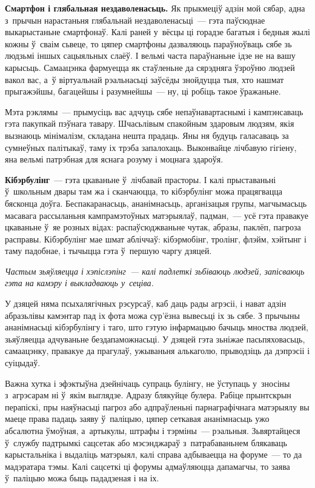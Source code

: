 
\textbf{Смартфон і глябальная нездаволенасьць.} Як прыкмеціў адзін мой сябар, адна з~прычын нарастаньня глябальнай нездаволенасьці~--- гэта паўсюднае выкарыстаньне смартфонаў. Калі раней у~вёсцы ці горадзе багатыя і бедныя жылі кожны ў~сваім сьвеце, то цяпер смартфоны дазваляюць параўноўваць сябе зь людзьмі іншых сацыяльных слаёў. І вельмі часта параўнаньне ідзе не на вашу карысьць. Самаацэнка фармуецца як стаўленьне да сярэдняга ўзроўню людзей вакол вас, а~ў віртуальнай рэальнасьці заўсёды знойдуцца тыя, хто нашмат прыгажэйшы, багацейшы і разумнейшы~--- ну, ці робіць такое ўражаньне.

Мэта рэклямы~--- прымусіць вас адчуць сябе непаўнавартаснымі і кампэнсаваць гэта пакупкай пэўнага тавару. Шчасьлівым спакойным здаровым людзям, якія вызнаюць мінімалізм, складана нешта прадаць. Яны ня будуць галасаваць за сумнеўных палітыкаў, таму іх трэба запалохаць. Выконвайце лічбавую гігіену, яна вельмі патрэбная для яснага розуму і моцнага здароўя.

\textbf{Кібэрбулінг}~--- гэта цкаваньне ў~лічбавай прасторы. І калі прыставаньні ў~школьным двары там жа і сканчаюцца, то кібэрбулінг можа працягвацца бясконца доўга. Беспакаранасьць, ананімнасьць, арганізацыя групы, магчымасьць масавага рассыланьня кампрамэтоўных матэрыялаў, падман,~--- усё гэта правакуе цкаваньне ў~яе розных відах: распаўсюджваньне чутак, абразы, паклёп, пагроза расправы. Кібэрбулінг мае шмат абліччаў: кібэрмобінг, тролінг, флэйм, хэйтынг і таму падобнае, і тычыцца гэта ў~першую чаргу дзяцей.

\emph{Частым зьяўляецца і хэпіслэпінг~--- калі падлеткі зьбіваюць людзей, запісваюць гэта на камэру і выкладваюць у~сеціва.}

У дзяцей няма псыхалягічных рэсурсаў, каб даць рады агрэсіі, і нават адзін абразьлівы камэнтар пад іх фота можа сур'ёзна вывесьці іх зь сябе. З прычыны ананімнасьці кібэрбулінгу і таго, што гэтую інфармацыю бачыць мноства людзей, зьяўляецца адчуваньне бездапаможнасьці. У дзяцей гэта зьніжае пасьпяховасьць, самаацэнку, правакуе да прагулаў, ужываньня алькаголю, прыводзіць да дэпрэсіі і суіцыдаў.

Важна хутка і эфэктыўна дзейнічаць супраць булінгу, не ўступаць у~зносіны з~агрэсарам ні ў~якім выглядзе. Адразу блякуйце булера. Рабіце прынтскрын перапіскі, пры наяўнасьці пагроз або адпраўленьні парнаграфічнага матэрыялу вы маеце права падаць заяву ў~паліцыю, цяпер сеткавая ананімнасьць ужо абсалютна ўмоўная, а~артыкулы, штрафы і тэрміны~--- рэальныя. Зьвяртайцеся ў~службу падтрымкі сацсетак або мэсэнджараў з~патрабаваньнем блякаваць карыстальніка і выдаліць матэрыял, калі справа адбываецца на форуме~--- то да мадэратара тэмы. Калі сацсеткі ці форумы адмаўляюцца дапамагчы, то заява ў~паліцыю можа быць пададзеная і на іх.

